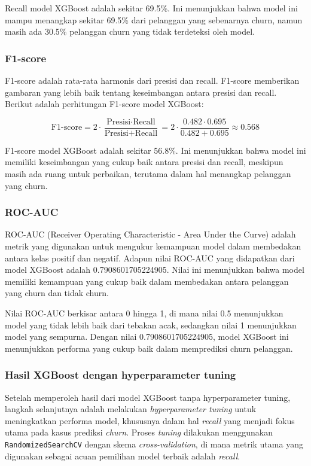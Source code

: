 Recall model XGBoost adalah sekitar 69.5\%. Ini menunjukkan bahwa model ini mampu menangkap sekitar 69.5\% dari pelanggan yang sebenarnya churn, namun masih ada 30.5\% pelanggan churn yang tidak terdeteksi oleh model.

\subsubsection*{F1-score}
F1-score adalah rata-rata harmonis dari presisi dan recall. F1-score memberikan gambaran yang lebih baik tentang keseimbangan antara presisi dan recall. Berikut adalah perhitungan F1-score model XGBoost:

\begin{equation}
    \text{F1-score} = 2 \cdot \frac{\text{Presisi} \cdot \text{Recall}}{\text{Presisi} + \text{Recall}} = 2 \cdot \frac{0.482 \cdot 0.695}{0.482 + 0.695} \approx 0.568
\end{equation}

F1-score model XGBoost adalah sekitar 56.8\%. Ini menunjukkan bahwa model ini memiliki keseimbangan yang cukup baik antara presisi dan recall, meskipun masih ada ruang untuk perbaikan, terutama dalam hal menangkap pelanggan yang churn.

\subsubsection*{ROC-AUC}
ROC-AUC (Receiver Operating Characteristic - Area Under the Curve) adalah metrik yang digunakan untuk mengukur kemampuan model dalam membedakan antara kelas positif dan negatif. Adapun nilai ROC-AUC yang didapatkan dari model XGBoost adalah 0.7908601705224905. Nilai ini menunjukkan bahwa model memiliki kemampuan yang cukup baik dalam membedakan antara pelanggan yang churn dan tidak churn.

Nilai ROC-AUC berkisar antara 0 hingga 1, di mana nilai 0.5 menunjukkan model yang tidak lebih baik dari tebakan acak, sedangkan nilai 1 menunjukkan model yang sempurna. Dengan nilai 0.7908601705224905, model XGBoost ini menunjukkan performa yang cukup baik dalam memprediksi churn pelanggan.

\subsubsection{Hasil XGBoost dengan hyperparameter tuning}

Setelah memperoleh hasil dari model XGBoost tanpa hyperparameter tuning, langkah selanjutnya adalah melakukan \textit{hyperparameter tuning} untuk meningkatkan performa model, khususnya dalam hal \textit{recall} yang menjadi fokus utama pada kasus prediksi \textit{churn}. Proses \textit{tuning} dilakukan menggunakan \texttt{RandomizedSearchCV} dengan skema \textit{cross-validation}, di mana metrik utama yang digunakan sebagai acuan pemilihan model terbaik adalah \textit{recall}.

